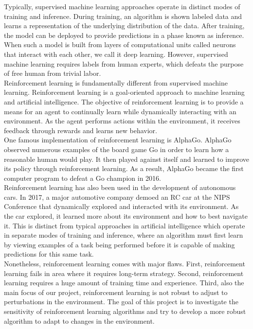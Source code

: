 \documentclass[12pt,letterpaper]{article}
\begin{document}
Typically, supervised machine learning approaches operate in distinct modes of training and inference. During training, an algorithm is shown labeled data and learns a representation of the underlying distribution of the data. After training, the model can be deployed to provide predictions in a phase known as inference. When such a model is built from layers of computational units called neurons that interact with each other, we call it deep learning. However, supervised machine learning requires labels from human experts, which defeats the purpose of free human from trivial labor. \\

Reinforcement learning is fundamentally different from supervised machine learning. Reinforcement learning is a goal-oriented approach to machine learning and artificial intelligence. The objective of reinforcement learning is to provide a means for an agent to continually learn while dynamically interacting with an environment. As the agent performs actions within the environment, it receives feedback through rewards and learns new behavior.\\

One famous implementation of reinforcement learning is AlphaGo. AlphaGo observed numerous examples of the board game Go in order to learn how a reasonable human would play. It then played against itself and learned to improve its policy through reinforcement learning. As a result, AlphaGo became the first computer program to defeat a Go champion in 2016.\\

Reinforcement learning has also been used in the development of autonomous cars. In 2017, a major automotive company demoed an RC car at the NIPS Conference that dynamically explored and interacted with its environment. As the car explored, it learned more about its environment and how to best navigate it. This is distinct from typical approaches in artificial intelligence which operate in separate modes of training and inference, where an algorithm must first learn by viewing examples of a task being performed before it is capable of making predictions for this same task. \\

Nonetheless, reinforcement learning comes with major flaws. First, reinforcement learning fails in area where it requires long-term strategy. Second, reinforcement learning requires a huge amount of training time and experience. Third, also the main focus of our project, reinforcement learning is not robust to adjust to perturbations in the environment. The goal of this project is to investigate the sensitivity of reinforcement learning algorithms and try to develop a more robust algorithm to adapt to changes in the environment.\\
\end{document}
